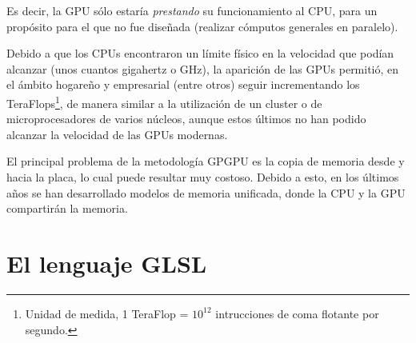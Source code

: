 Es decir, la GPU sólo estaría {\em prestando} su funcionamiento al CPU, para un propósito para el que no fue diseñada (realizar cómputos generales en paralelo).

Debido a que los CPUs encontraron un límite físico en la velocidad que podían alcanzar (unos cuantos gigahertz o GHz), la aparición de las GPUs permitió, en el ámbito hogareño y empresarial (entre otros) seguir incrementando los TeraFlops\footnote{Unidad de medida, 1 TeraFlop = $10^{12}$ intrucciones de coma flotante por segundo.}, de manera similar a la utilización de un cluster o de microprocesadores de varios núcleos, aunque estos últimos no han podido alcanzar la velocidad de las GPUs modernas.

El principal problema de la metodología GPGPU es la copia de memoria desde y hacia la placa, lo cual puede resultar muy costoso.
Debido a esto, en los últimos años se han desarrollado modelos de memoria unificada, donde la CPU y la GPU compartirán la memoria.



\section{El lenguaje GLSL}

